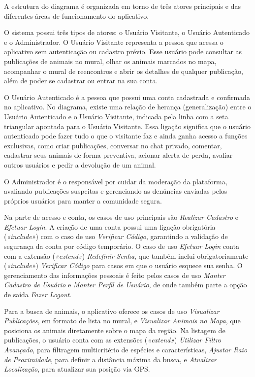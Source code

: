 A estrutura do diagrama é organizada em torno de três atores principais e das diferentes áreas de funcionamento do aplicativo.

O sistema possui três tipos de atores: o Usuário Visitante, o Usuário Autenticado e o Administrador. O Usuário Visitante representa a pessoa que acessa o aplicativo sem autenticação ou cadastro prévio. Esse usuário pode consultar as publicações de animais no mural, olhar os animais marcados no mapa, acompanhar o mural de reencontros e abrir os detalhes de qualquer publicação, além de poder se cadastrar ou entrar na sua conta.

O Usuário Autenticado é a pessoa que possui uma conta cadastrada e confirmada no aplicativo. No diagrama, existe uma relação de herança (generalização) entre o Usuário Autenticado e o Usuário Visitante, indicada pela linha com a seta triangular apontada para o Usuário Visitante. Essa ligação significa que o usuário autenticado pode fazer tudo o que o visitante faz e ainda ganha acesso a funções exclusivas, como criar publicações, conversar no chat privado, comentar, cadastrar seus animais de forma preventiva, acionar alerta de perda, avaliar outros usuários e pedir a devolução de um animal.

O Administrador é o responsável por cuidar da moderação da plataforma, avaliando publicações suspeitas e gerenciando as denúncias enviadas pelos próprios usuários para manter a comunidade segura.

Na parte de acesso e conta, os casos de uso principais são \textit{Realizar Cadastro} e \textit{Efetuar Login}. A criação de uma conta possui uma ligação obrigatória (\textit{«include»}) com o caso de uso \textit{Verificar Código}, garantindo a validação de segurança da conta por código temporário. O caso de uso \textit{Efetuar Login} conta com a extensão (\textit{«extend»}) \textit{Redefinir Senha}, que também inclui obrigatoriamente (\textit{«include»}) \textit{Verificar Código} para casos em que o usuário esquece sua senha. O gerenciamento das informações pessoais é feito pelos casos de uso \textit{Manter Cadastro de Usuário} e \textit{Manter Perfil de Usuário}, de onde também parte a opção de saída \textit{Fazer Logout}.

Para a busca de animais, o aplicativo oferece os casos de uso \textit{Visualizar Publicações}, em formato de lista no mural, e \textit{Visualizar Animais no Mapa}, que posiciona os animais diretamente sobre o mapa da região. Na listagem de publicações, o usuário conta com as extensões (\textit{«extend»}) \textit{Utilizar Filtro Avançado}, para filtragem multicritério de espécies e características, \textit{Ajustar Raio de Proximidade}, para definir a distância máxima da busca, e \textit{Atualizar Localização}, para atualizar sua posição via GPS.

